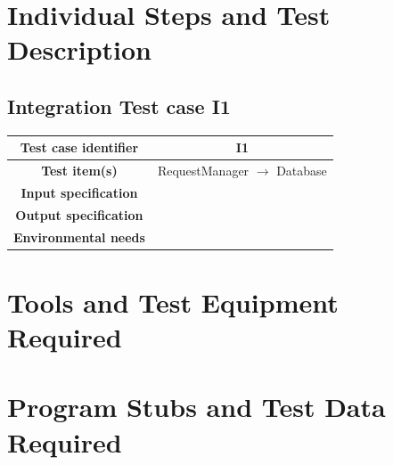 \documentclass[18pt,oneside,a4paper, titlepage]{article}
\begin{document}
\newpage
\section{Individual	Steps	and	Test	Description}
	\subsection{Integration Test case I1}
	\begin{center}
		\centering
		\begin{tabular}{| c| c|}
			\hline 		\textbf{Test case identifier} & I1 \\
			\hline		\textbf{Test item(s)}  & RequestManager $\rightarrow$ Database \\
			\hline		\textbf{Input specification} & \\
			\hline		\textbf{Output specification} & \\
			\hline		\textbf{Environmental needs} & \\
			\hline
			\end{tabular}
			\end{center}

\newpage
\section{Tools	and	Test	Equipment	Required}

\newpage
\section{Program	Stubs	and	Test	Data	Required}
\end{document}
